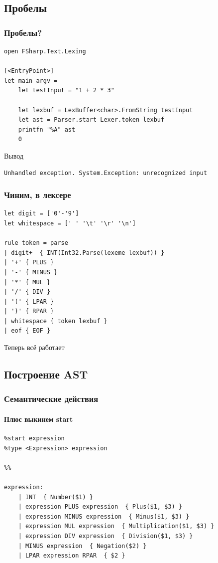 \documentclass{../../slides-style}
\begin{document}
    \subsection{Пробелы}

    \begin{frame}[fragile]
        \frametitle{Пробелы?}
        \begin{verbatim}
open FSharp.Text.Lexing

[<EntryPoint>]
let main argv =
    let testInput = "1 + 2 * 3"

    let lexbuf = LexBuffer<char>.FromString testInput
    let ast = Parser.start Lexer.token lexbuf
    printfn "%A" ast
    0 
        \end{verbatim}
        \begin{exampleblock}{Вывод}
            \begin{verbatim}
Unhandled exception. System.Exception: unrecognized input
            \end{verbatim}
        \end{exampleblock}
    \end{frame}

    \begin{frame}[fragile]
        \frametitle{Чиним, в лексере}
        \begin{verbatim}
let digit = ['0'-'9']
let whitespace = [' ' '\t' '\r' '\n']

rule token = parse
| digit+  { INT(Int32.Parse(lexeme lexbuf)) }
| '+' { PLUS }
| '-' { MINUS }
| '*' { MUL }
| '/' { DIV }
| '(' { LPAR }
| ')' { RPAR }
| whitespace { token lexbuf }
| eof { EOF }
        \end{verbatim}
        Теперь всё работает
    \end{frame}

    \subsection{Построение AST}

    \begin{frame}[fragile]
        \frametitle{Семантические действия}
        \framesubtitle{Плюс выкинем start}
        \begin{verbatim}
%start expression
%type <Expression> expression

%%

expression:
    | INT  { Number($1) }
    | expression PLUS expression  { Plus($1, $3) }
    | expression MINUS expression  { Minus($1, $3) }
    | expression MUL expression  { Multiplication($1, $3) }
    | expression DIV expression  { Division($1, $3) }
    | MINUS expression  { Negation($2) }
    | LPAR expression RPAR  { $2 }
        \end{verbatim}
    \end{frame}
\end{document}
